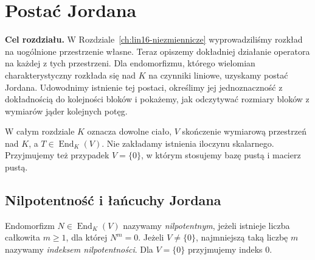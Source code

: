 \chapter{Postać Jordana}
\label{ch:lin17-jordan}

\providecommand{\atlasref}[2]{#2}


\noindent\textbf{Cel rozdziału.}
W Rozdziale~\ref{ch:lin16-niezmiennicze}
wyprowadziliśmy rozkład na uogólnione przestrzenie własne.
Teraz opiszemy dokładniej działanie operatora
na każdej z tych przestrzeni.
Dla endomorfizmu, którego wielomian
charakterystyczny rozkłada się nad \(K\)
na czynniki liniowe, uzyskamy postać Jordana.
Udowodnimy istnienie tej postaci, określimy
jej jednoznaczność z dokładnością do kolejności bloków
i pokażemy, jak odczytywać rozmiary bloków
z wymiarów jąder kolejnych potęg.

W całym rozdziale \(K\) oznacza dowolne ciało,
\(V\) skończenie wymiarową przestrzeń nad \(K\),
a \(T\in\operatorname{End}_K(V)\).
Nie zakładamy istnienia iloczynu skalarnego.
Przyjmujemy też przypadek \(V=\{0\}\),
w którym stosujemy bazę pustą i macierz pustą.

\section{Nilpotentność i łańcuchy Jordana}
\label{sec:lin17-nilpotent}

\begin{definicja}
\label{def:lin17-nilpotent}
Endomorfizm \(N\in\operatorname{End}_K(V)\)
nazywamy \emph{nilpotentnym}, jeżeli
istnieje liczba całkowita \(m\ge1\), dla której
\(N^m=0\).
Jeżeli \(V\ne\{0\}\), najmniejszą taką
liczbę \(m\) nazywamy \emph{indeksem nilpotentności}.
Dla \(V=\{0\}\) przyjmujemy indeks \(0\).
\end{definicja}

